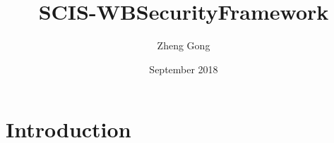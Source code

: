 \documentclass{article}
\title{SCIS-WBSecurityFramework}
\author{Zheng Gong}
\date{September 2018}
\begin{document}
\maketitle

\section{Introduction}
\end{document}
